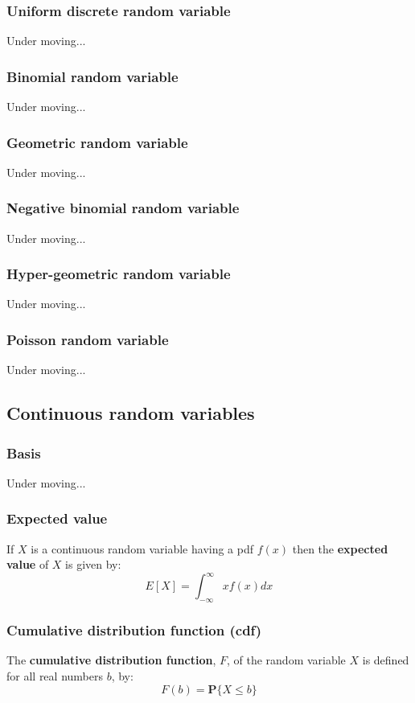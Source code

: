 \subsubsection{Uniform discrete random variable}
Under moving...


\subsubsection{Binomial random variable}
Under moving...


\subsubsection{Geometric random variable}
Under moving...


\subsubsection{Negative binomial random variable}
Under moving...


\subsubsection{Hyper-geometric random variable}
Under moving...


\subsubsection{Poisson random variable}
Under moving...



\subsection{Continuous random variables}
\subsubsection{Basis}
Under moving...


\subsubsection{Expected value}
If $X$ is a continuous random variable having a pdf $f(x)$ then the \textbf{expected value} of $X$ is given by: 
\begin{equation}
    E[X] = \int_{-\infty}^\infty x f(x) dx
\end{equation}


\subsubsection{Cumulative distribution function (cdf)}
The \textbf{cumulative distribution function}, $F$, of the random variable $X$ is defined for all real numbers $b$, by:
\begin{equation}
    F(b) = \mathbf{P}\{X \leq b\}
\end{equation}


